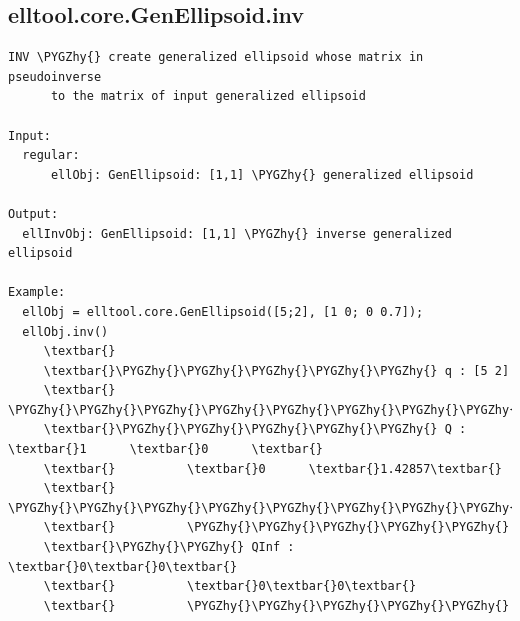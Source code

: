\documentclass[letterpaper,10pt,english]{sphinxmanual}
\def\PYGZhy{\char`\-}
\begin{document}
\subsection{elltool.core.GenEllipsoid.inv}
\label{chap_functions:elltool-core-genellipsoid-inv}
\begin{Verbatim}[commandchars=\\\{\}]
INV \PYGZhy{} create generalized ellipsoid whose matrix in pseudoinverse
      to the matrix of input generalized ellipsoid

Input:
  regular:
      ellObj: GenEllipsoid: [1,1] \PYGZhy{} generalized ellipsoid

Output:
  ellInvObj: GenEllipsoid: [1,1] \PYGZhy{} inverse generalized ellipsoid

Example:
  ellObj = elltool.core.GenEllipsoid([5;2], [1 0; 0 0.7]);
  ellObj.inv()
     \textbar{}
     \textbar{}\PYGZhy{}\PYGZhy{}\PYGZhy{}\PYGZhy{}\PYGZhy{} q : [5 2]
     \textbar{}          \PYGZhy{}\PYGZhy{}\PYGZhy{}\PYGZhy{}\PYGZhy{}\PYGZhy{}\PYGZhy{}\PYGZhy{}\PYGZhy{}\PYGZhy{}\PYGZhy{}\PYGZhy{}\PYGZhy{}\PYGZhy{}\PYGZhy{}\PYGZhy{}\PYGZhy{}
     \textbar{}\PYGZhy{}\PYGZhy{}\PYGZhy{}\PYGZhy{}\PYGZhy{} Q : \textbar{}1      \textbar{}0      \textbar{}
     \textbar{}          \textbar{}0      \textbar{}1.42857\textbar{}
     \textbar{}          \PYGZhy{}\PYGZhy{}\PYGZhy{}\PYGZhy{}\PYGZhy{}\PYGZhy{}\PYGZhy{}\PYGZhy{}\PYGZhy{}\PYGZhy{}\PYGZhy{}\PYGZhy{}\PYGZhy{}\PYGZhy{}\PYGZhy{}\PYGZhy{}\PYGZhy{}
     \textbar{}          \PYGZhy{}\PYGZhy{}\PYGZhy{}\PYGZhy{}\PYGZhy{}
     \textbar{}\PYGZhy{}\PYGZhy{} QInf : \textbar{}0\textbar{}0\textbar{}
     \textbar{}          \textbar{}0\textbar{}0\textbar{}
     \textbar{}          \PYGZhy{}\PYGZhy{}\PYGZhy{}\PYGZhy{}\PYGZhy{}
\end{Verbatim}
\end{document}

